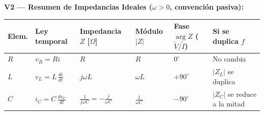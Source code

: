 \documentclass[11pt, a4paper]{article}
\newcommand{\phasor}[1]{\widetilde{#1}}
\begin{document}
\vspace{0.25cm}
\noindent\textbf{V2 — Resumen de Impedancias Ideales ($\omega > 0$, convención pasiva):}\par\vspace{0.1cm}
{\small
\renewcommand{\arraystretch}{1.25}
\noindent
\begin{tabularx}{\textwidth}{
  >{\bfseries\centering\arraybackslash}p{1.4cm}
  >{\centering\arraybackslash}p{2.3cm}
  >{\centering\arraybackslash}p{2.8cm}
  >{\centering\arraybackslash}p{2.0cm}
  >{\centering\arraybackslash}p{2.6cm}
  >{\RaggedRight\arraybackslash}X}
\toprule
\textbf{Elem.} & \textbf{Ley temporal} & \textbf{Impedancia $Z$ [$\Omega$]} & \textbf{Módulo $|Z|$} & \textbf{Fase $\arg Z$ ($\phasor{V}/\phasor{I}$)} & \textbf{Si se duplica $f$} \\
\midrule
$R$ & $v_R = R i$ & $R$ & $R$ & $0^\circ$ & No cambia \\
$L$ & $v_L = L\,\frac{di}{dt}$ & $j\omega L$ & $\omega L$ & $+90^\circ$ & $|Z_L|$ se duplica \\
$C$ & $i_C = C\,\frac{dv_C}{dt}$ & $\frac{1}{j\omega C} = -\frac{j}{\omega C}$ & $\frac{1}{\omega C}$ & $-90^\circ$ & $|Z_C|$ se reduce a la mitad \\
\bottomrule
\end{tabularx}\par}
\end{document}
